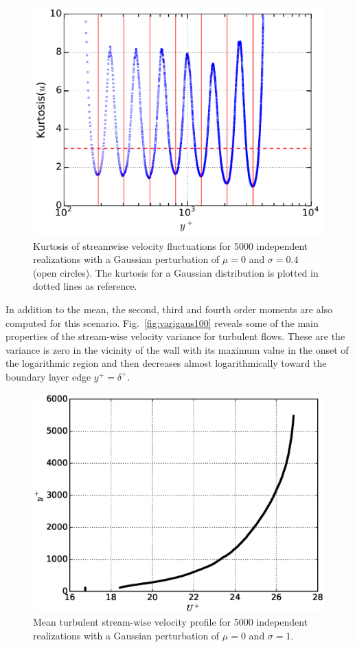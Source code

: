 \documentclass[aps,reprint,amsmath,amssymb,pra]{revtex4-1}%
\begin{document}
\begin{figure}[tb]
\includegraphics[scale=0.46]{figures/kurtosis_5000_assembles}
\caption{\label{fig:kurt} Kurtosis of streamwise velocity fluctuations for 5000 independent realizations with a Gaussian perturbation of $\mu=0$ and $\sigma=0.4$ (open circles). The kurtosis for a Gaussian distribution is plotted in dotted lines as reference.}
\end{figure}
In addition to the mean, the second, third and fourth order moments are also computed for this scenario. Fig.~\ref{fig:varigaus100} reveals some of the main properties of the stream-wise velocity variance for turbulent flows.  These are the variance is zero in the vicinity of the wall with its maximum value in the onset of the logarithmic region and then decreases almost logarithmically toward the boundary layer edge $y^+=\delta^+$. 
\begin{figure}[tb]
\includegraphics[scale=0.46]{figures/Master_averaged_step_profile_5000_assembles_gaus100}
\caption{\label{fig:mp_gau100} Mean turbulent stream-wise velocity profile for 5000 independent realizations with a Gaussian perturbation of $\mu=0$ and $\sigma=1$.}
\end{figure}
\end{document}
